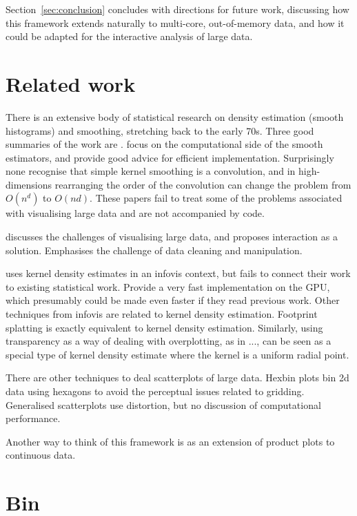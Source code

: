 \documentclass[journal]{vgtc}                %
\begin{document}
Section~\ref{sec:conclusion} concludes with directions for future work, discussing how this framework extends naturally to multi-core, out-of-memory data, and how it could be adapted for the interactive analysis of large data.

\section{Related work}
\label{sec:related-work}

There is an extensive body of statistical research on density estimation (smooth histograms) and smoothing, stretching back to the early 70s. Three good summaries of the work are \cite{scott:1992,bowman:1997,loader:1999a}.    \cite{hardle:1992,wand:1994,fan:1994} focus on the computational side of the smooth estimators, and provide good advice for efficient implementation.  Surprisingly none recognise that simple kernel smoothing is a convolution, and in high-dimensions rearranging the order of the convolution can change the problem from $O(n^d)$ to $O(nd)$. These papers fail to treat some of the problems associated with visualising large data and are not accompanied by code.

\citep{heer:2012} discusses the challenges of visualising large data, and proposes interaction as a solution. Emphasises the challenge of data cleaning and manipulation.

\citep{lampe:2011} uses kernel density estimates in an infovis context, but fails to connect their work to existing statistical work. Provide a very fast implementation on the GPU, which presumably could be made even faster if they read previous work. Other techniques from infovis are related to kernel density estimation. Footprint splatting \citep{becker:1997,yang:2003} is exactly equivalent to kernel density estimation.  Similarly, using transparency as a way of dealing with overplotting, as in ..., can be seen as a special type of kernel density estimate where the kernel is a uniform radial point.

There are other techniques to deal scatterplots of large data. Hexbin plots \citep{carr:1987} bin 2d data using hexagons to avoid the perceptual issues related to gridding. Generalised scatterplots \citep{keim:2010} use distortion, but no discussion of computational performance.  

Another way to think of this framework is as an extension of product plots \citep{me:prodplots} to continuous data.  

\section{Bin}
\label{sec:bin}
\end{document}
